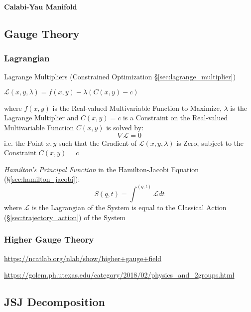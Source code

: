 \paragraph{Calabi-Yau Manifold}\label{sec:calabi_yau_manifold}



\subsection{Gauge Theory}\label{sec:gauge_theory}


\subsubsection{Lagrangian}\label{sec:lagrangian}

\fist Lagrange Multipliers (Constrained Optimization
\S\ref{sec:lagrange_multiplier})

$\mathcal{L}(x,y,\lambda) = f(x,y) - \lambda (C(x,y) - c)$

where $f(x,y)$ is the Real-valued Multivariable Function to Maximize, $\lambda$
is the Lagrange Multiplier and $C(x,y) = c$ is a Constraint on the Real-valued
Multivariable Function $C(x,y)$ is solved by:
\[
  \nabla\mathcal{L} = 0
\]
i.e. the Point $x,y$ such that the Gradient of $\mathcal{L}(x,y,\lambda)$ is
Zero, subject to the Constraint $C(x,y) = c$

\emph{Hamilton's Principal Function} in the Hamilton-Jacobi Equation
(\S\ref{sec:hamilton_jacobi}):
\[
  S(q,t) = \int^{(q,t)} \mathcal{L} dt
\]
where $\mathcal{L}$ is the Lagrangian of the System is equal to the Classical
Action (\S\ref{sec:trajectory_action}) of the System



\subsubsection{Higher Gauge Theory}\label{sec:higher_gauge_theory}

\url{https://ncatlab.org/nlab/show/higher+gauge+field}

\url{https://golem.ph.utexas.edu/category/2018/02/physics_and_2groups.html}



\subsection{JSJ Decomposition}\label{sec:jsj_decomposition}

